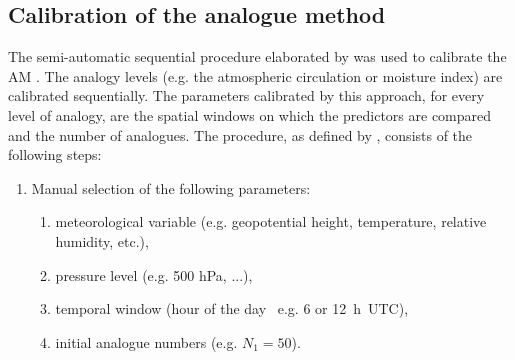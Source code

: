 \documentclass[hess, manuscript]{copernicus}
\begin{document}
	
	\subsection{Calibration of the analogue method}
	\label{sec:calibration}
	
	The semi-automatic sequential procedure elaborated by \citet{Bontron2004} was used to calibrate the AM \cite[see also ][]{Radanovics2013, BenDaoud2016}. The analogy levels (e.g. the atmospheric circulation or moisture index) are calibrated sequentially. The parameters calibrated by this approach, for every level of analogy, are the spatial windows on which the predictors are compared and the number of analogues. The procedure, as defined by \citet{Bontron2004}, consists of the following steps:
	
	\begin{enumerate}
		\item Manual selection of the following parameters:
		\begin{enumerate}
			\item meteorological variable (e.g. geopotential height, temperature, relative humidity, etc.),
			\item pressure level (e.g. 500 hPa, ...),
			\item temporal window (hour of the day \textendash\ e.g. 6 or 12~h~UTC),
			\item initial analogue numbers (e.g. $N_{1}=50$).
		\end{enumerate}
		

\end{enumerate}
\end{document}
